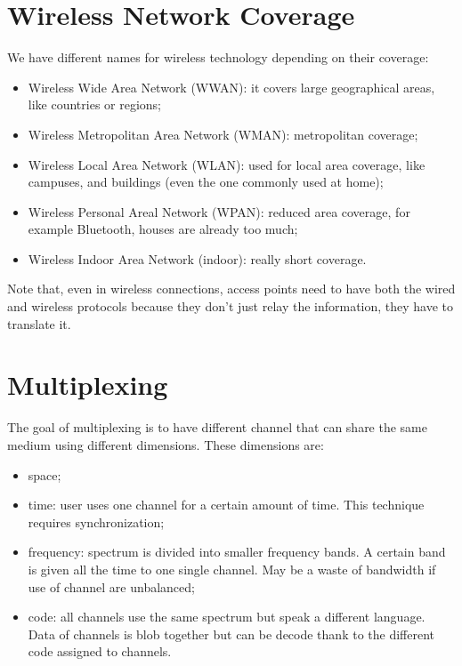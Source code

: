 \section{Wireless Network Coverage}
We have different names for wireless technology depending on their 
coverage:
\begin{itemize}
\item Wireless Wide Area Network (WWAN): it covers large 
  geographical areas, like countries or regions;
\item Wireless Metropolitan Area Network (WMAN): metropolitan 
  coverage;
\item Wireless Local Area Network (WLAN): used for local area 
  coverage, like campuses,  and buildings (even the one commonly used at home);
\item Wireless Personal Areal Network (WPAN): reduced area 
  coverage, for example Bluetooth, houses are already too much;
\item Wireless Indoor Area Network (indoor): really short 
  coverage.
\end{itemize}

Note that, even in wireless connections, access points need to have both 
the wired and wireless protocols because they don't just relay the information, 
they have to translate it.

\section{Multiplexing}
The goal of multiplexing is to have different channel that can share the same
medium using different dimensions. These dimensions are:
\begin{itemize}
\item space;
\item time: user uses one channel for a certain amount of time. This technique
  requires synchronization;
\item frequency: spectrum is divided into smaller frequency bands. A certain
  band is given all the time to one single channel. May be a waste of bandwidth
  if use of channel are unbalanced;
\item code: all channels use the same spectrum but speak a different language.
  Data of channels is blob together but can be decode thank to the different
  code assigned to channels.
\end{itemize}

